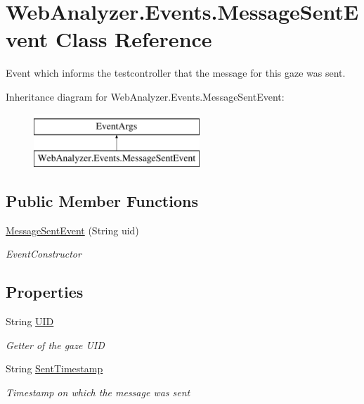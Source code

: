 \hypertarget{class_web_analyzer_1_1_events_1_1_message_sent_event}{}\section{Web\+Analyzer.\+Events.\+Message\+Sent\+Event Class Reference}
\label{class_web_analyzer_1_1_events_1_1_message_sent_event}


Event which informs the testcontroller that the message for this gaze was sent.  


Inheritance diagram for Web\+Analyzer.\+Events.\+Message\+Sent\+Event\+:\begin{figure}[H]
\begin{center}
\leavevmode
\includegraphics[height=2.000000cm]{class_web_analyzer_1_1_events_1_1_message_sent_event}
\end{center}
\end{figure}
\subsection*{Public Member Functions}
\begin{DoxyCompactItemize}
\item 
\hyperlink{class_web_analyzer_1_1_events_1_1_message_sent_event_a20f49da5ed8a32d8af10923a0e3b1f0b}{Message\+Sent\+Event} (String uid)
\begin{DoxyCompactList}\small\item\em Event\+Constructor \end{DoxyCompactList}\end{DoxyCompactItemize}
\subsection*{Properties}
\begin{DoxyCompactItemize}
\item 
String \hyperlink{class_web_analyzer_1_1_events_1_1_message_sent_event_a04217696019822bcc61e6890810b8442}{U\+I\+D}
\begin{DoxyCompactList}\small\item\em Getter of the gaze U\+I\+D \end{DoxyCompactList}\item 
String \hyperlink{class_web_analyzer_1_1_events_1_1_message_sent_event_a7408640c7a1d8de43f36ca70b01c49b0}{Sent\+Timestamp}
\begin{DoxyCompactList}\small\item\em Timestamp on which the message was sent \end{DoxyCompactList}\end{DoxyCompactItemize}

